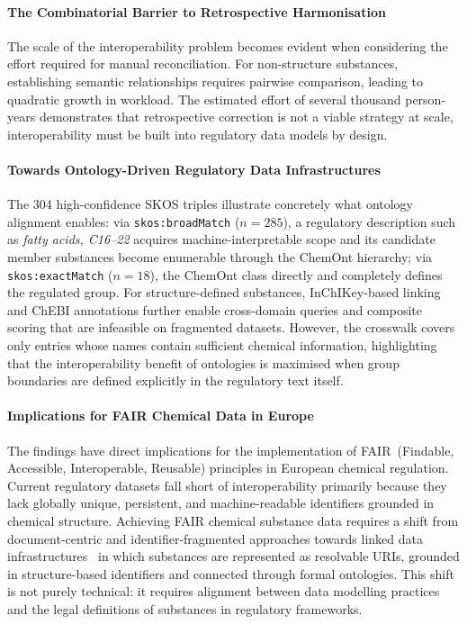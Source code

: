 \paragraph{The Combinatorial Barrier to Retrospective Harmonisation}

The scale of the interoperability problem becomes evident when considering the effort required for manual reconciliation. For non-structure substances, establishing semantic relationships requires pairwise comparison, leading to quadratic growth in workload. The estimated effort of several thousand person-years demonstrates that retrospective correction is not a viable strategy at scale, interoperability must be built into regulatory data models by design.

\paragraph{Towards Ontology-Driven Regulatory Data Infrastructures}

The 304 high-confidence SKOS triples illustrate concretely what ontology alignment enables: via \texttt{skos:broadMatch} ($n = 285$), a regulatory description such as \textit{fatty acids, C16--22} acquires machine-interpretable scope and its candidate member substances become enumerable through the ChemOnt hierarchy; via \texttt{skos:exactMatch} ($n = 18$), the ChemOnt class directly and completely defines the regulated group. For structure-defined substances, InChIKey-based linking and ChEBI annotations further enable cross-domain queries and composite scoring that are infeasible on fragmented datasets. However, the crosswalk covers only entries whose names contain sufficient chemical information, highlighting that the interoperability benefit of ontologies is maximised when group boundaries are defined explicitly in the regulatory text itself.

\paragraph{Implications for FAIR Chemical Data in Europe}

The findings have direct implications for the implementation of FAIR~(Findable, Accessible, Interoperable, Reusable) principles in European chemical regulation. Current regulatory datasets fall short of interoperability primarily because they lack globally unique, persistent, and machine-readable identifiers grounded in chemical structure. Achieving FAIR chemical substance data requires a shift from document-centric and identifier-fragmented approaches towards linked data infrastructures~\cite{BernersLee2006LinkedData,Heath2011LinkedData} in which substances are represented as resolvable URIs, grounded in structure-based identifiers and connected through formal ontologies. This shift is not purely technical: it requires alignment between data modelling practices and the legal definitions of substances in regulatory frameworks.

